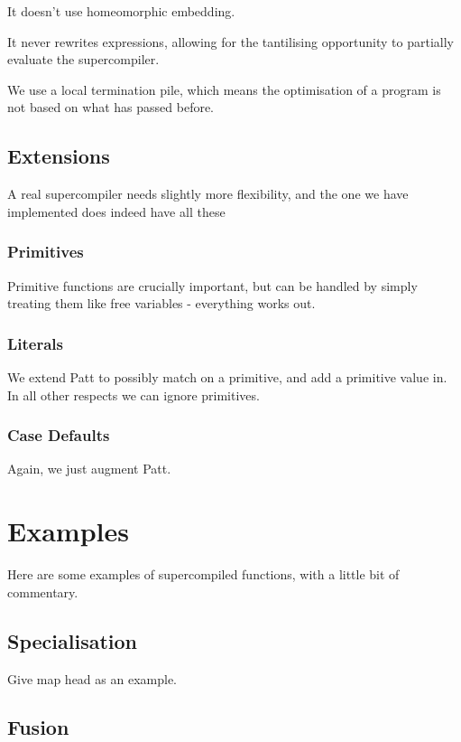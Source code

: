 \documentclass{sigplanconf}
\begin{document}
It doesn't use homeomorphic embedding.

It never rewrites expressions, allowing for the tantilising opportunity to partially evaluate the supercompiler.

We use a local termination pile, which means the optimisation of a program is not based on what has passed before.

\subsection{Extensions}
\label{sec:extensions}

A real supercompiler needs slightly more flexibility, and the one we have implemented does indeed have all these

\subsubsection{Primitives}

Primitive functions are crucially important, but can be handled by simply treating them like free variables - everything works out.

\subsubsection{Literals}

We extend Patt to possibly match on a primitive, and add a primitive value in. In all other respects we can ignore primitives.

\subsubsection{Case Defaults}

Again, we just augment Patt.

\section{Examples}

Here are some examples of supercompiled functions, with a little bit of commentary.

\subsection{Specialisation}

Give map head as an example.

\subsection{Fusion}
\end{document}
